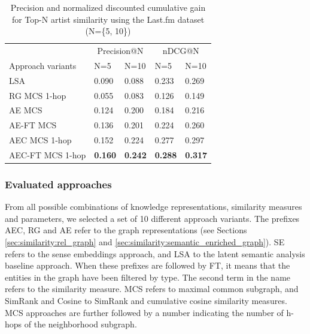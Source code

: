 \begin{table}
\small
\centering
	\begin{tabular}{ lllll }
 	\toprule
	& \multicolumn{2}{c}{Precision@N} & \multicolumn{2}{c}{nDCG@N} \\
\cmidrule(lr){2-3}
 \cmidrule(lr){4-5}
	Approach variants & N=5 & N=10 & N=5 & N=10 \\
	\midrule
LSA & 0.090 & 0.088 & 0.233 & 0.269 \\
RG MCS 1-hop & 0.055 & 0.083 & 0.126 & 0.149 \\
AE MCS & 0.124 & 0.200 & 0.184 & 0.216 \\
AE-FT MCS & 0.136 & 0.201 & 0.224 & 0.260 \\
AEC MCS 1-hop & 0.152 & 0.224 & 0.277 & 0.297 \\
AEC-FT MCS 1-hop & \textbf{0.160} & \textbf{0.242} & \textbf{0.288} & \textbf{0.317} \\
\bottomrule
	\end{tabular}
	\caption{Precision and normalized discounted cumulative gain for Top-N artist similarity using the Last.fm dataset (N=\{5, 10\})}	
	\label{tbl:similarity:res_lastfm}
\end{table}

\subsubsection{Evaluated approaches}\label{sec:similarity:eval_approaches} %

From all possible combinations of knowledge representations, similarity measures and parameters, we selected a set of 10 different approach variants. The prefixes AEC, RG and AE refer to the graph representations (see Sections \ref{sec:similarity:rel_graph} and \ref{sec:similarity:semantic_enriched_graph}). %
SE refers to the sense embeddings approach, and LSA to the latent semantic analysis baseline approach. When these prefixes are followed by FT, it means that the entities in the graph have been filtered by type. The second term in the name refers to the similarity measure. MCS refers to maximal common subgraph, and SimRank and Cosine to SimRank and cumulative cosine similarity measures. MCS approaches are further followed by a number indicating the number of h-hops of the neighborhood subgraph.


